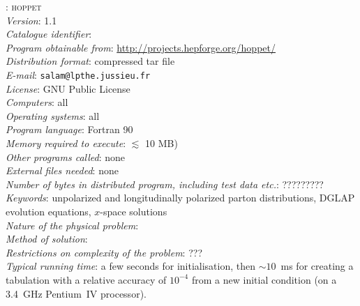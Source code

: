 \documentclass[12pt]{article}
\newcommand{\hoppet}{\textsc{hoppet}\xspace}
\begin{document}
: \hoppet \\[2mm]
{\em Version\/}: 1.1 \\[2mm]
{\em Catalogue identifier\/}: \\[2mm]
{\em Program obtainable from\/}: \url{http://projects.hepforge.org/hoppet/}
\\[2mm]
{\em Distribution format\/}: compressed tar file \\[2mm]
{\em E-mail\/}: {\tt salam@lpthe.jussieu.fr} \\[2mm]
{\em License\/}: GNU Public License \\[2mm]
{\em Computers\/}: all \\[2mm]
{\em Operating systems\/}: all \\[2mm]
{\em Program language\/}: Fortran 90 \\[2mm]
{\em Memory required to execute\/}:  $\lesssim$ 10 MB) \\[2mm]
{\em Other programs called\/}: none \\[2mm]
{\em External files needed\/}: none \\[2mm]
{\em Number of bytes in distributed program, including test data 
     etc.\/}: ?????????\\[2mm]
{\em Keywords\/}: unpolarized and longitudinally polarized parton 
distributions, DGLAP evolution equations, $x$-space 
solutions
\\[2mm]
{\em Nature of the physical problem\/}:
\\[2mm]
%
{\em Method of solution\/}:
\\[2mm]
{\em Restrictions on complexity of the problem\/}: ???
\\[2mm]
{\em Typical running time\/}: a few seconds for initialisation, then
$\sim 10$~ms for creating a tabulation with a relative accuracy of
$10^{-4}$ from a new initial condition (on a 3.4~GHz Pentium~IV
processor).

\newpage
\tableofcontents


\end{document}
